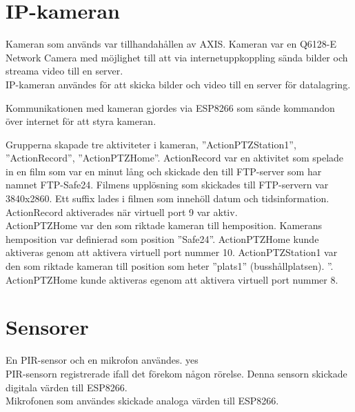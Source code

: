 \section{IP-kameran}
Kameran som används var tillhandahållen av AXIS. Kameran var en Q6128-E Network Camera med möjlighet till att via  internetuppkoppling sända bilder och streama video till en server.\\

IP-kameran användes för att skicka bilder och video till en server för datalagring.

Kommunikationen med kameran gjordes via ESP8266 som sände kommandon över internet för att styra kameran.

Grupperna skapade tre aktiviteter i kameran, ”ActionPTZStation1”, ”ActionRecord”, ”ActionPTZHome”.
ActionRecord var en aktivitet som spelade in en film som var en minut lång och skickade den till FTP-server som har namnet FTP-Safe24. Filmens upplösning som skickades till FTP-servern var 3840x2860. Ett suffix lades i filmen som innehöll datum och tidsinformation. ActionRecord aktiverades när virtuell port 9 var aktiv.\\
ActionPTZHome var den som riktade kameran till hemposition. Kamerans hemposition var definierad som position ”Safe24”. ActionPTZHome kunde aktiveras genom att aktivera virtuell port nummer 10.
ActionPTZStation1 var den som riktade kameran till position som heter ”plats1” (busshållplatsen). ”. ActionPTZHome kunde aktiveras egenom att aktivera virtuell port nummer 8.


\section{Sensorer}
En PIR-sensor och en mikrofon användes. yes\\

PIR-sensorn registrerade ifall det förekom någon rörelse. Denna sensorn skickade digitala värden till ESP8266.\\

Mikrofonen som användes skickade analoga värden till ESP8266.\\






 



